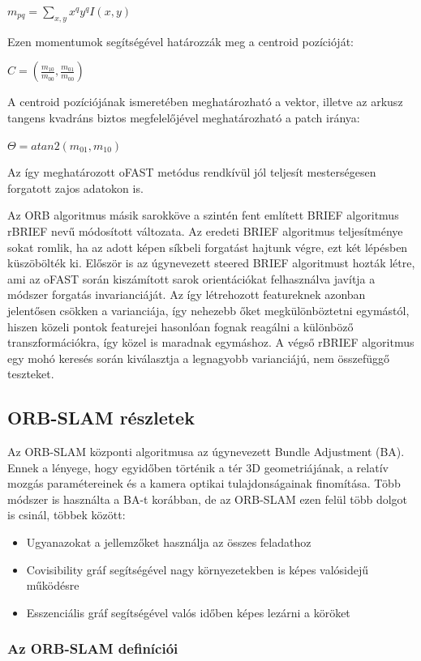 $ m_{pq} = \sum_{x,y}^{}x^{q}y^{q}I(x,y) $

Ezen momentumok segítségével határozzák meg a centroid pozícióját:

$ C = (\frac{m_{10}}{m_{00}},\frac{m_{01}}{m_{00}}) $

A centroid pozíciójának ismeretében meghatározható a vektor, illetve az arkusz tangens kvadráns biztos megfelelőjével meghatározható a patch iránya:

$ \Theta = atan2(m_{01},m_{10}) $

Az így meghatározott oFAST metódus rendkívül jól teljesít mesterségesen forgatott zajos adatokon is.

Az ORB algoritmus másik sarokköve a szintén fent említett BRIEF algoritmus rBRIEF nevű módosított változata.
Az eredeti BRIEF algoritmus teljesítménye sokat romlik, ha az adott képen síkbeli forgatást hajtunk végre, ezt két lépésben küszöbölték ki.
Először is az úgynevezett steered BRIEF algoritmust hozták létre, ami az oFAST során kiszámított sarok orientációkat felhasználva javítja a módszer forgatás invarianciáját.
Az így létrehozott featureknek azonban jelentősen csökken a varianciája, így nehezebb őket megkülönböztetni egymástól, hiszen közeli pontok featurejei hasonlóan fognak reagálni a különböző transzformációkra, így közel is maradnak egymáshoz.
A végső rBRIEF algoritmus egy mohó keresés során kiválasztja a legnagyobb varianciájú, nem összefüggő teszteket.

\subsection{ORB-SLAM részletek}

Az ORB-SLAM központi algoritmusa az úgynevezett Bundle Adjustment (BA). 
Ennek a lényege, hogy egyidőben történik a tér 3D geometriájának, a relatív mozgás paramétereinek és a kamera optikai tulajdonságainak finomítása.
Több módszer is használta a BA-t korábban, de az ORB-SLAM ezen felül több dolgot is csinál, többek között: 
\begin{itemize}
	\item Ugyanazokat a jellemzőket használja az összes feladathoz
	\item Covisibility gráf segítségével nagy környezetekben is képes valósidejű működésre
	\item Esszenciális gráf segítségével valós időben képes lezárni a köröket
\end{itemize}

\subsubsection{Az ORB-SLAM definíciói}

